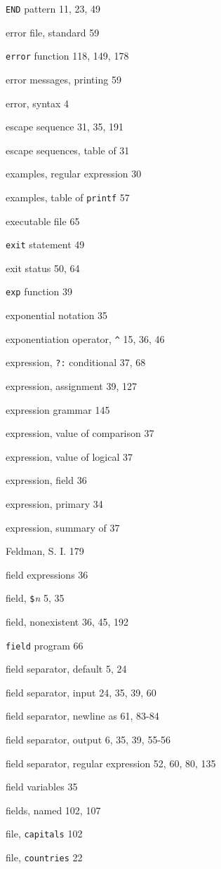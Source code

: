 \begin{multicols}{2}
\verb'END' pattern 11, 23, 49

error file, standard 59

\verb'error' function 118, 149, 178

error messages, printing 59

error, syntax 4

escape sequence 31, 35, 191

escape sequences, table of 31

examples, regular expression 30

examples, table of \verb'printf' 57

executable file 65

\verb'exit' statement 49

exit status 50, 64

\verb'exp' function 39

exponential notation 35

exponentiation operator, \verb'^' 15, 36, 46

expression, \verb'?:' conditional 37, 68

expression, assignment 39, 127

expression grammar 145

expression, value of comparison 37

expression, value of logical 37

expression, field 36

expression, primary 34

expression, summary of 37

Feldman, S. I. 179

field expressions 36

field, \verb'$'\textit{n} 5, 35

field, nonexistent 36, 45, 192

\verb'field' program 66

field separator, default 5, 24

field separator, input 24, 35, 39, 60

field separator, newline as 61, 83-84

field separator, output 6, 35, 39, 55-56

field separator, regular expression 52, 60, 80, 135

field variables 35

fields, named 102, 107

file, \verb'capitals' 102

file, \verb'countries' 22


\end{multicols}
